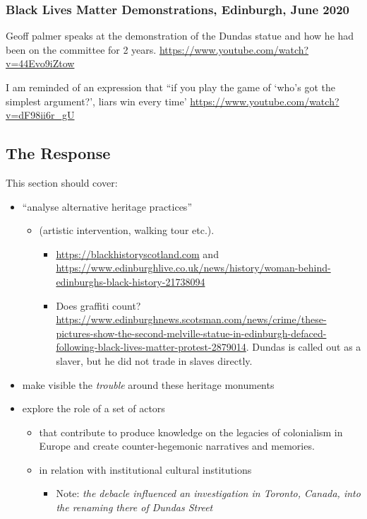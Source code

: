 \documentclass{scrartcl}
\begin{document}
\subsubsection{Black Lives Matter Demonstrations, Edinburgh, June 2020}

Geoff palmer speaks at the demonstration of the Dundas statue and how he had been on the committee for 2 years. \url{https://www.youtube.com/watch?v=44Evo9iZtow}

I am reminded of an expression that ``if you play the game of `who's got the simplest argument?', liars win every time' \url{https://www.youtube.com/watch?v=dF98ii6r_gU}

\subsection{The Response}

This section should cover:

\begin{itemize}
    \item ``analyse alternative heritage practices''
    \begin{itemize}
        \item  (artistic intervention, walking tour etc.).
        \begin{itemize}
            \begin{itemize}
                \item \url{https://blackhistoryscotland.com} and \url{https://www.edinburghlive.co.uk/news/history/woman-behind-edinburghs-black-history-21738094}
            \end{itemize}
        \end{itemize}
        \begin{itemize}
            \item Does graffiti count? \url{https://www.edinburghnews.scotsman.com/news/crime/these-pictures-show-the-second-melville-statue-in-edinburgh-defaced-following-black-lives-matter-protest-2879014}. Dundas is called out as a slaver, but he did not trade in slaves directly.
        \end{itemize}
    \end{itemize}
    \item make visible the \textit{trouble} around these heritage monuments
    \item explore the role of a set of actors
    \begin{itemize}
        \item that contribute to produce knowledge on the legacies of colonialism in Europe and create counter-hegemonic narratives and memories.
        \item in relation with institutional cultural institutions
        \begin{itemize}
            \item Note: \textit{the debacle influenced an investigation in Toronto, Canada, into the renaming there of Dundas Street} \cite{mccarthy_2022_1}
        \end{itemize}
    \end{itemize}
\end{itemize}
\end{document}

